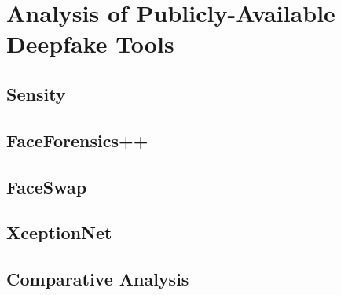 
\chapter{Analysis of Publicly-Available Deepfake Tools}\label{chapter:tools}

\section{Sensity}\label{chapter:sensity}
\section{FaceForensics++}\label{chapter:faceforensics}
\section{FaceSwap}\label{chapter:faceswap}
\section{XceptionNet}\label{chapter:xceptionnet}
\section{Comparative Analysis}\label{chapter:analysis}